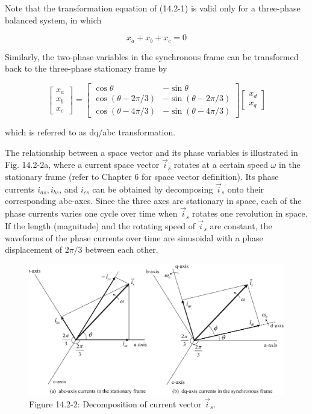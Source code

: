 \documentclass[letterpaper,12pt]{article}
\begin{document}
Note that the transformation equation of (14.2-1) is valid only for a three-phase balanced system, in which

\begin{equation}
x_a + x_b + x_c = 0 \tag{14.2-4}
\end{equation} 

Similarly, the two-phase variables in the synchronous frame can be transformed back to the three-phase stationary frame by

\begin{equation}
\begin{bmatrix}
x_a \\
x_b \\
x_c
\end{bmatrix}
=
\begin{bmatrix}
\cos \theta & -\sin \theta \\
\cos(\theta - 2\pi/3) & -\sin(\theta - 2\pi/3) \\
\cos(\theta - 4\pi/3) & -\sin(\theta - 4\pi/3)
\end{bmatrix}
\begin{bmatrix}
x_d \\
x_q
\end{bmatrix} \tag{14.2-5}
\end{equation} 

which is referred to as dq/abc transformation.

The relationship between a space vector and its phase variables is illustrated in Fig. 14.2-2a, where a current space vector $\vec{i}_s$ rotates at a certain speed $\omega$ in the stationary frame (refer to Chapter 6 for space vector definition). Its phase currents $i_{as}, i_{bs}$, and $i_{cs}$ can be obtained by decomposing $\vec{i}_s$ onto their corresponding abc-axes. Since the three axes are stationary in space, each of the phase currents varies one cycle over time when $\vec{i}_s$ rotates one revolution in space. If the length (magnitude) and the rotating speed of $\vec{i}_s$ are constant, the waveforms of the phase currents over time are sinusoidal with a phase displacement of $2\pi/3$ between each other.

\begin{figure}[h]
\centering
\includegraphics{graficos/img02.jpg}
\caption{Figure 14.2-2: Decomposition of current vector $\vec{i}_s$.}
\end{figure}
\FloatBarrier
\end{document}
